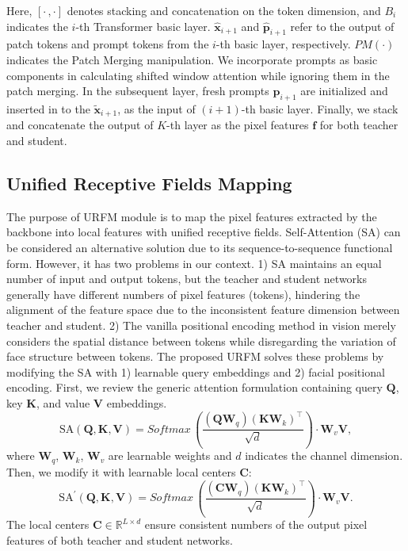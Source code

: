 \documentclass[sigconf]{acmart}
\begin{document}
Here, $[\cdot\,,\cdot]$ denotes stacking and concatenation on the token dimension, and $B_i$ indicates the $i$-th Transformer basic layer. $\hat{\mathbf{x}}_{i+1}$ and $\hat{\mathbf{p}}_{i+1}$ refer to the output of patch tokens and prompt tokens from the $i$-th basic layer, respectively. $PM(\cdot)$ indicates the Patch Merging manipulation. We incorporate prompts as basic components in calculating shifted window attention \cite{swin} while ignoring them in the patch merging. In the subsequent layer, fresh prompts $\mathbf{p}_{i+1}$ are initialized and inserted in to the $\tilde{\mathbf{x}}_{i+1}$, as the input of $(i+1)$-th basic layer. Finally, we stack and concatenate the output of $K$-th layer as the pixel features $\bm{f}$ for both teacher and student.
\subsection{Unified Receptive Fields Mapping}
The purpose of URFM module is to map the pixel features extracted by the backbone into local features with unified receptive fields. Self-Attention (SA) can be considered an alternative solution due to its sequence-to-sequence functional form. However, it has two problems in our context. 1) SA maintains an equal number of input and output tokens, but the teacher and student networks generally have different numbers of pixel features (tokens), hindering the alignment of the feature space due to the inconsistent feature dimension between teacher and student. 2) The vanilla positional encoding method in vision \cite{ape} merely considers the spatial distance between tokens while disregarding the variation of face structure between tokens. The proposed URFM solves these problems by modifying the SA with 1) learnable query embeddings and 2) facial positional encoding.
First, we review the generic attention formulation containing query $\bm{Q}$, key $\bm{K}$, and value $\bm{V}$ embeddings.
\begin{equation}
\mbox{SA}(\bm{Q}, \mathbf{K}, \bm{V}) = Softmax\,(\frac{(\bm{Q}\bm{W}_{q}) (\bm{K}\bm{W}_{k})^\top}{\sqrt{d}}) \cdot \bm{W}_{v}\bm{V},
\label{eq3}
\end{equation}
where $\bm{W}_{q}$, $\bm{W}_{k}$, $\bm{W}_{v}$ are learnable weights and $d$ indicates the channel dimension. Then, we modify it with learnable local centers $\bm{C}$:
\begin{equation}
\mbox{SA}^{\prime}(\bm{Q}, \mathbf{K}, \bm{V}) = Softmax\,(\frac{(\bm{C}\bm{W}_{q}) (\bm{K}\bm{W}_{k})^\top}{\sqrt{d}}) \cdot\bm{W}_{v}\bm{V}.
\label{eq4}
\end{equation}
The local centers $\bm{C} \in \mathbb{R}^{L\times d}$ ensure consistent numbers of the output pixel features of both teacher and student networks.
\end{document}
